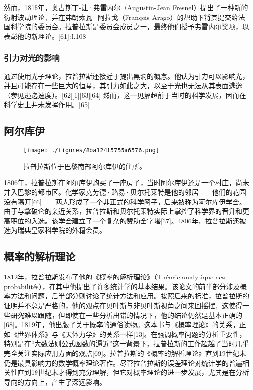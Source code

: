 然而，1815年，奥古斯丁-让·弗雷内尔（Augustin-Jean Fresnel）提出了一种新的衍射波动理论，并在弗朗索瓦·阿拉戈（François Arago）的帮助下将其提交给法国科学院的委员会。拉普拉斯是委员会成员之一，最终他们授予弗雷内尔奖项，以表彰他的新理论。[61]: I.108 
\subsubsection{引力对光的影响}  
通过使用光子理论，拉普拉斯还接近于提出黑洞的概念。他认为引力可以影响光，并且可能存在一些巨大的恒星，其引力如此之大，以至于光也无法从其表面逃逸（参见逃逸速度）。[62][1][63][64] 然而，这一见解超前于当时的科学发展，因而在科学史上并未发挥作用。[65]
\subsection{阿尔库伊}
\begin{figure}[ht]
\centering
\texttt{[image: ./figures/8ba12415755a6576.png]}
\caption{拉普拉斯位于巴黎南部阿尔库伊的住所。} \label{fig_LPLS_9}
\end{figure}
1806年，拉普拉斯在阿尔库伊购买了一座房子，当时阿尔库伊还是一个村庄，尚未并入巴黎的都市区。化学家克劳德·路易·贝尔托莱特是他的邻居——他们的花园没有隔开[66]——两人形成了一个非正式的科学圈子，后来被称为阿尔库伊学会。由于与拿破仑的亲近关系，拉普拉斯和贝尔托莱特实际上掌控了科学界的晋升和更高职位的入选。该学会建立了一个复杂的赞助金字塔[67]。1806年，拉普拉斯还被选为瑞典皇家科学院的外籍会员。
\subsection{概率的解析理论}  
1812年，拉普拉斯发布了他的《概率的解析理论》（Théorie analytique des probabilités），在其中他提出了许多统计学的基本结果。该论文的前半部分涉及概率方法和问题，后半部分则讨论了统计方法和应用。按照后来的标准，拉普拉斯的证明并不总是严格的，他的观点在贝叶斯与非贝叶斯视角之间来回摇摆，这使得一些研究难以跟随，但即使在一些分析出错的情况下，他的结论仍然是基本正确的[68]。1819年，他出版了关于概率的通俗读物。这本书与《概率理论》的关系，正如《世界体系》与《天体力学》的关系一样[13]。在强调概率问题的分析重要性，特别是在“大数法则公式函数的逼近”这一背景下，拉普拉斯的工作超越了当时几乎完全关注实际应用方面的观点[69]。拉普拉斯的《概率的解析理论》直到19世纪末仍是最具影响力的数学概率理论著作。尽管拉普拉斯的误差理论对统计学的普遍相关性直到19世纪末才得到充分理解，但它对概率理论的进一步发展，尤其是在分析导向的方向上，产生了深远影响。
